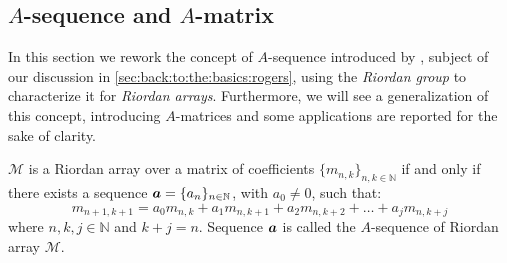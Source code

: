 
\subsection{$A$-sequence and $A$-matrix}
\label{sec:back:to:the:basics:sequences}

In this section we rework the concept of $A$-sequence introduced by
\citeauthor{rogers:1977}, subject of our discussion in
\autoref{sec:back:to:the:basics:rogers}, using the \emph{Riordan group}
to characterize it for \emph{Riordan arrays}. Furthermore, we will see
a generalization of this concept, introducing $A$-matrices and some
applications are reported for the sake of clarity.

\begin{theorem}
    $\mathcal{M}$ is a Riordan array over a matrix of coefficients
    $\lbrace m_{n,k}\rbrace_{n,k\in\mathbb{N}}$ if and only if
    there exists a sequence $\boldsymbol{a}=\lbrace a_{n}\rbrace_{n\in\mathbb{N}}$,
    with $a_{0}\neq0$, such that:
    \begin{displaymath}
        m_{n+1,k+1}=a_{0}m_{n,k}+a_{1}m_{n,k+1}+a_{2}m_{n,k+2}+\ldots+a_{j}m_{n,k+j}
    \end{displaymath}
    where $n,k,j\in\mathbb{N}$ and $k+j=n$. Sequence $\boldsymbol{a}$ is called the $A$-sequence
    of Riordan array $\mathcal{M}$. 
    \label{thm:merlini:A:sequence:characterization} 
\end{theorem}
